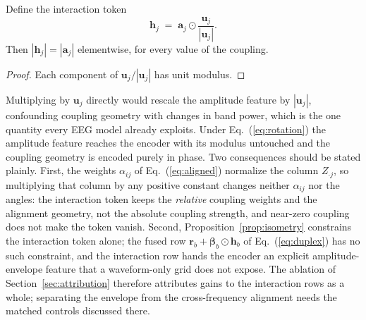 \begin{proposition}
\label{prop:isometry}
Define the interaction token
\begin{equation}
\mathbf{h}_j \;=\; \mathbf{a}_j \odot
\frac{\mathbf{u}_j}{|\mathbf{u}_j|} .
\label{eq:rotation}
\end{equation}
Then $|\mathbf{h}_j| = |\mathbf{a}_j|$ elementwise, for every value of the
coupling.
\end{proposition}
\begin{proof}
Each component of $\mathbf{u}_j/|\mathbf{u}_j|$ has unit modulus.
\end{proof}

Multiplying by $\mathbf{u}_j$ directly would rescale the amplitude feature
by $|\mathbf{u}_j|$, confounding coupling geometry with changes in band
power, which is the one quantity every EEG model already exploits. Under
Eq.~(\ref{eq:rotation}) the amplitude feature reaches the encoder with
its modulus untouched and the coupling geometry is encoded purely in
phase. Two consequences should be stated plainly. First, the weights
$\alpha_{ij}$ of Eq.~(\ref{eq:aligned}) normalize the column
$Z_{\cdot j}$, so multiplying that column by any positive constant changes
neither $\alpha_{ij}$ nor the angles: the interaction token keeps the
\emph{relative} coupling weights and the alignment geometry, not the
absolute coupling strength, and near-zero coupling does not make the
token vanish. Second, Proposition~\ref{prop:isometry} constrains the
interaction token alone; the fused row $\mathbf{r}_b + \boldsymbol{\beta}_b
\odot \mathbf{h}_b$ of Eq.~(\ref{eq:duplex}) has no such constraint, and
the interaction row hands the encoder an explicit amplitude-envelope
feature that a waveform-only grid does not expose. The ablation of
Section~\ref{sec:attribution} therefore attributes gains to the
interaction rows as a whole; separating the envelope from the
cross-frequency alignment needs the matched controls discussed there.

